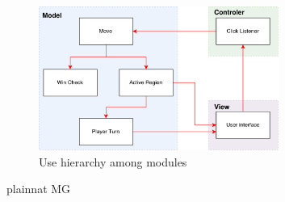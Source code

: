 \documentclass[12pt, titlepage]{article}
\begin{document}
\begin{figure}[H]
\centering
\includegraphics[width=0.7\textwidth]{UseHierarchy_Diagram.pdf}
\caption{Use hierarchy among modules}
\label{FigUH}
\end{figure}

 {plainnat}
 {MG}
\end{document}
